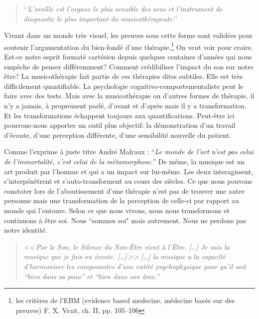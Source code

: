  
\begin{quotation}
	`\textit{`L'oreille est l'organe le plus sensible des sens 
et l'instrument de diagnostic  le plus important du
musicothérapeute}.''\autocite{seminar_zuerich}
 	
\end{quotation}

Vivant dans un monde très visuel, les preuves sous cette forme sont
validées pour soutenir l'argumentation du bien-fondé d'une thérapie.\footnote{
	les critères de l'EBM (evidence based medecine, médecine basée sur des 
        preuves) F. X. Vrait, ch. II, pp. 105--106 }
On veut voir pour croire. Est-ce 
notre esprit formaté cartésien depuis quelques centaines d'années qui nous 
empêche de penser différemment? 
Comment crédibiliser l'impact 
du son sur notre être?
La musicothérapie fait partie de ces thérapies dites subtiles. Elle
est très difficilement quantifiable. La
psychologie cognitivo-comportementaliste peut le faire avec des tests. Mais avec la musicothérapie ou d'autres formes de thérapie, il n'y a
jamais, à proprement parlé, d'avant et d'après mais il y a transformation.
Et les transformations échappent toujours aux quantifications. Peut-être
ici pourrons-nous apporter un outil plus objectif: la démonstration d'un travail d'écoute, d'une perception
différente, d'une sensibilité nouvelle du patient.

 


Comme l'exprime à juste titre André Malraux : \enquote{\emph{Le monde de
	l'art n'est pas celui de l'immortalité, c'est celui de la métamorphose.}}
De même, la musique est un art produit par l'homme et qui a un impact
sur lui-même. Les deux interagissent, s'interpénètrent et s'auto-transforment
au cours des siècles.
 Ce que nous pouvons constater lors de l'aboutissement
d'une thérapie n'est pas de trouver une autre personne mais une transformation
de la perception de celle-ci par rapport au monde qui l'entoure. 
Selon
ce que nous vivons, nous nous transformons et continuons à être
soi. Nous ``sommes soi" mais autrement. Nous ne perdons
pas notre identité.


\label{jeSuisLaMusique:viret}
\begin{quotation}
\emph{<<\,\emph{Par le Son, le Silence du Non-Être vient à l'Être}. [\dots] 
\textsl{Je suis}
	\emph{la musique que je fais ou écoute}. [\dots]\,>>
[\ldots] \emph{la musique a la capacité d'harmoniser
les composantes d'une entité psychophysique pour qu'il soit ``bien
dans sa peau'' et ``bien dans son âme.}''}\, \autocite[ch. 1, p.8]{viret:b}
\end{quotation}


